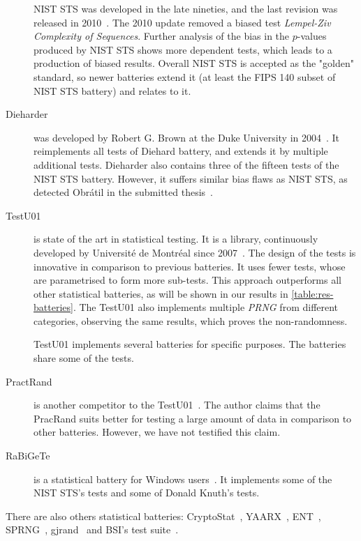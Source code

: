 \documentclass[
    digital,    %
    oneside,    %
    color,
    11pt,
    nocover,
    notable,
    nolof,
    nolot,
]{fithesis3}
\begin{document}
\begin{description}
    NIST STS was developed in the late nineties, and the last revision was released in 2010~\cite{rukhin2001statistical}. The 2010 update removed a biased test \textit{Lempel-Ziv Complexity of Sequences}. Further analysis of the bias in the $p$-values produced by NIST STS shows more dependent tests, which leads to a production of biased results. Overall NIST STS is accepted as the "golden" standard, so newer batteries extend it (at least the FIPS 140 subset of NIST STS battery) and relates to it. %
    \item[Dieharder] was developed by Robert G. Brown at the Duke University in 2004~\cite{brown2013dieharder}. It reimplements all tests of Diehard battery, and extends it by multiple additional tests. Dieharder also contains three of the fifteen tests of the NIST STS battery. However, it suffers similar bias flaws as NIST STS, as detected Obrátil in the submitted thesis~\cite{obratilMgrThesis}. %
    \item[TestU01] is state of the art in statistical testing. It is a library, continuously developed by Université de Montréal since 2007~\cite{l2007testu01}. The design of the tests is innovative in comparison to previous batteries. It uses fewer tests, whose are parametrised to form more sub-tests. This approach outperforms all other statistical batteries, as will be shown in our results in \cref{table:res-batteries}. The TestU01 also implements multiple \textit{PRNG} from different categories, observing the same results, which proves the non-randomness. %

    TestU01 implements several batteries for specific purposes. The batteries share some of the tests.
    \item[PractRand] is another competitor to the TestU01~\cite{dotypractically}. The author claims that the PracRand suits better for testing a large amount of data in comparison to other batteries. However, we have not testified this claim.
    \item[RaBiGeTe] is a statistical battery for Windows users~\cite{rabigete}. It implements some of the NIST STS's tests and some of Donald Knuth's tests.
\end{description}

There are also others statistical batteries: CryptoStat~\cite{kaminsky2013cryptostat}, YAARX~\cite{biryukov2014automatic}, ENT~\cite{walker2008ent}, SPRNG~\cite{mascagni2000algorithm}, gjrand~\cite{gjrand} and BSI's test suite~\cite{schindler2002evaluation}.

\end{document}
